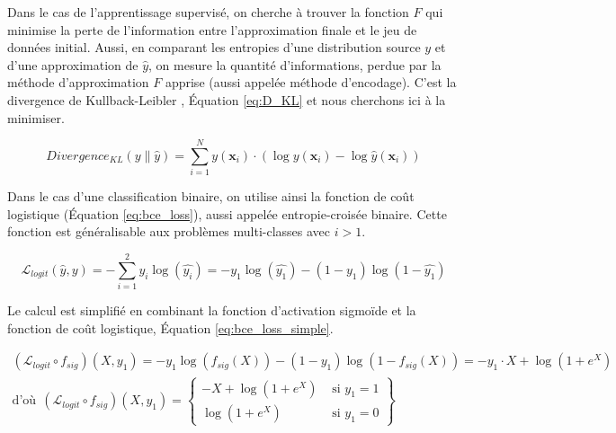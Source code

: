Dans le cas de l'apprentissage supervisé, on cherche à trouver la fonction $F$ qui minimise la perte de l'information entre l'approximation finale et le jeu de données initial.
Aussi, en comparant les entropies d'une distribution source $y$ et d'une approximation de $\hat{y}$, on mesure la quantité d'informations, perdue par la méthode d'approximation $F$ apprise (aussi appelée méthode d'encodage).
C'est la divergence de Kullback-Leibler \cite{kullback_information_1951}, Équation \ref{eq:D_KL} et nous cherchons ici à la minimiser.

\begin{equation} \label{eq:D_KL}
Divergence_{K L}(y \| \hat{y})=\sum_{i=1}^{N} y\left(\mathbf{x}_{i}\right) \cdot\left(\log y\left(\mathbf{x}_{i}\right)-\log \hat{y}\left(\mathbf{x}_{i}\right)\right)
\end{equation}

Dans le cas d'une classification binaire, on utilise ainsi la fonction de coût logistique (Équation \ref{eq:bce_loss}), aussi appelée entropie-croisée binaire. Cette fonction est généralisable aux problèmes multi-classes avec $i > 1$.

\begin{equation} \label{eq:bce_loss}
\mathcal{L}_{logit}\left(\hat{y}, y\right) = -\sum^{2}_{i=1} y_{i} \log \left(\hat{y_{i}}\right) = - y_{1} \log \left(\hat{y_{1}}\right) -\left(1-y_{1}\right) \log \left(1-\hat{y_{1}}\right)
\end{equation}

Le calcul est simplifié en combinant la fonction d'activation sigmoïde et la fonction de coût logistique, Équation \ref{eq:bce_loss_simple}.

\begin{equation} \label{eq:bce_loss_simple}
\begin{split}
\left(\mathcal{L}_{logit} \circ f_{sig}\right)\left(X, y_{1}\right) = - y_{1} \log \left(f_{sig}(X)\right) -\left(1-y_{1}\right) \log \left(1-f_{sig}(X)\right) = -y_1 \cdot X +\log \left(1+e^{X}\right)
\\
\text{d'où} \ \ \left(\mathcal{L}_{logit} \circ f_{sig}\right)\left(X, y_{1}\right) = \left\{\begin{array}{cc}{- X +\log \left(1+e^{X}\right)} & {\text { si } y_{1}=1} \\ {\log \left(1+e^{X}\right)} & {\text { si } y_{1}=0}\end{array}\right\}
\end{split}
\end{equation}

